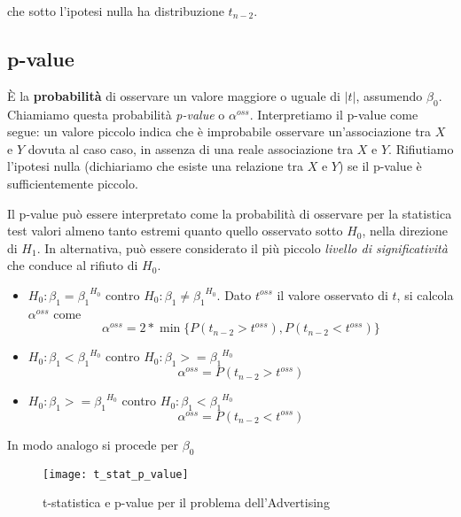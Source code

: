 che sotto l'ipotesi nulla ha distribuzione $t_{n-2}$.

\subsection{p-value}

È la \textbf{probabilità} di osservare un valore maggiore o uguale di $|t|$, assumendo ${\beta}_0$. Chiamiamo questa probabilità \textit{p-value} o ${\alpha}^{oss}$. Interpretiamo il p-value come segue: un valore piccolo indica che è improbabile osservare un'associazione tra $X$ e $Y$ dovuta al caso caso, in assenza di una reale associazione tra  $X$ e $Y$. Rifiutiamo l'ipotesi nulla (dichiariamo che esiste una relazione tra $X$ e $Y$) se il p-value è sufficientemente piccolo.

Il p-value può essere interpretato come la probabilità di osservare per la statistica test valori almeno tanto estremi
quanto quello osservato sotto $H_0$, nella direzione di $H_1$. In alternativa, può essere considerato il più piccolo \textit{livello di significatività} che conduce al rifiuto di $H_0$.

\begin{itemize}
\item $H_{0}: {\beta}_1 = {{\beta}_1}^{H_0}$ contro $H_{0}: {\beta}_1 \neq {{\beta}_1}^{H_0}$. Dato $t^{oss}$ il valore osservato di $t$, si calcola ${\alpha}^{oss}$ come \begin{equation}
{\alpha}^{oss} = 2*\min\{P(t_{n-2} > t^{oss}),P(t_{n-2} < t^{oss})\}
\end{equation}
\item $H_{0}: {\beta}_1 < {{\beta}_1}^{H_0}$ contro $H_{0}: {\beta}_1 >= {{\beta}_1}^{H_0}$
\begin{equation}
{\alpha}^{oss} = P(t_{n-2} > t^{oss})
\end{equation}
\item $H_{0}: {\beta}_1 >= {{\beta}_1}^{H_0}$ contro $H_{0}: {\beta}_1 < {{\beta}_1}^{H_0}$
\begin{equation}
{\alpha}^{oss} = P(t_{n-2} < t^{oss})
\end{equation}
\end{itemize}

In modo analogo si procede per ${\beta}_0$

\begin{figure}[H]
\centering
\texttt{[image: t\_stat\_p\_value]}
\caption{t-statistica e p-value per il problema dell'Advertising}
\end{figure}
